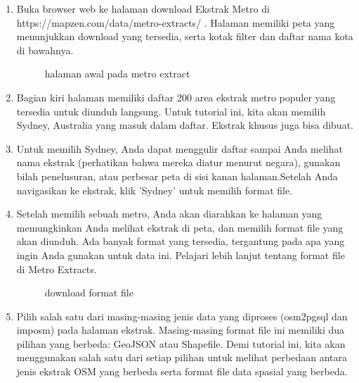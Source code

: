 \begin{enumerate}
\item
Buka browser web ke halaman download Ekstrak Metro di https://mapzen.com/data/metro-extracts/ . Halaman memiliki peta yang menunjukkan download yang tersedia, serta kotak filter dan daftar nama kota di bawahnya.

\begin{figure}[ht]
\caption{halaman awal pada metro extract}
\label {halamanawal}
\end{figure}

\item 
Bagian kiri halaman memiliki daftar 200 area ekstrak metro populer yang tersedia untuk diunduh langsung. Untuk tutorial ini, kita akan memilih Sydney, Australia yang masuk dalam daftar. Ekstrak khusus juga bisa dibuat.
\item
Untuk memilih Sydney, Anda dapat menggulir daftar sampai Anda melihat nama ekstrak (perhatikan bahwa mereka diatur menurut negara), gunakan bilah penelusuran, atau perbesar peta di sisi kanan halaman.Setelah Anda navigasikan ke ekstrak, klik 'Sydney' untuk memilih format file.
\item
Setelah memilih sebuah metro, Anda akan diarahkan ke halaman yang memungkinkan Anda melihat ekstrak di peta, dan memilih format file yang akan diunduh. Ada banyak format yang tersedia, tergantung pada apa yang ingin Anda gunakan untuk data ini. Pelajari lebih lanjut tentang format file di Metro Extracts.

\begin{figure}[ht]
\caption{download format file}
\label {formatfile}
\end{figure}


\item
Pilih salah satu dari masing-masing jenis data yang diproses (osm2pgsql dan imposm) pada halaman ekstrak. Masing-masing format file ini memiliki dua pilihan yang berbeda: GeoJSON atau Shapefile. Demi tutorial ini, kita akan menggunakan salah satu dari setiap pilihan untuk melihat perbedaan antara jenis ekstrak OSM yang berbeda serta format file data spasial yang berbeda.

\end{enumerate}

